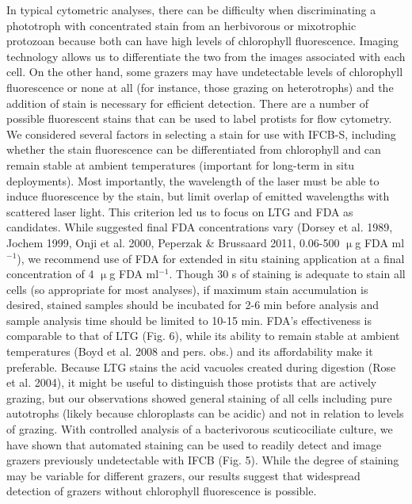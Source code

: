 In typical cytometric analyses, there can be difficulty when discriminating a phototroph with concentrated stain from an herbivorous or mixotrophic protozoan because both can have high levels of chlorophyll fluorescence. Imaging technology allows us to differentiate the two from the images associated with each cell. On the other hand, some grazers may have undetectable levels of chlorophyll fluorescence or none at all (for instance, those grazing on heterotrophs) and the addition of stain is necessary for efficient detection. There are a number of possible fluorescent
stains that can be used to label protists for flow cytometry. We considered several factors in selecting a stain for use with IFCB-S, including whether the stain fluorescence can be differentiated from chlorophyll and can remain stable at ambient temperatures (important for long-term in situ deployments). Most importantly, the wavelength of the laser must be able to induce fluorescence by the stain, but limit overlap of emitted wavelengths with scattered laser light. This criterion led us to focus on LTG and FDA as candidates. While suggested final FDA concentrations vary (Dorsey et al. 1989, Jochem 1999, Onji et al. 2000, Peperzak \& Brussaard 2011, 0.06-500 $\upmu$g FDA ml$^{-1}$), we recommend use of FDA for extended in situ staining application at a final concentration of 4 $\upmu$g FDA ml$^{-1}$. Though 30 s of staining is adequate to stain all cells (so appropriate for most analyses), if maximum stain accumulation is desired, stained samples should be incubated for 2-6 min before analysis and sample analysis time should be limited to 10-15 min. FDA's effectiveness is comparable to that of LTG (Fig. 6), while its ability to remain stable at ambient temperatures (Boyd et al. 2008 and pers. obs.) and its affordability make it preferable. Because LTG stains the acid vacuoles created during digestion (Rose et al. 2004), it might be useful to distinguish those protists that are actively grazing, but our observations showed general staining of all cells including pure autotrophs (likely because chloroplasts can be acidic) and not in relation to levels of grazing. With controlled analysis of a bacterivorous scuticociliate culture, we have shown that automated staining can be used to readily detect and image grazers previously undetectable with IFCB (Fig. 5). While the degree of staining may be variable for different grazers, our results suggest that widespread detection of grazers without chlorophyll fluorescence is possible.

